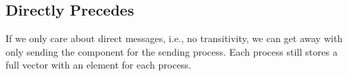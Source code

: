 \documentclass[twoside]{article}
\begin{document}
\subsection{Directly Precedes}
If we only care about direct messages, i.e., no transitivity,
we can get away with only sending the component for the sending process.
Each process still stores a full vector with an element for each process.









\end{document}
